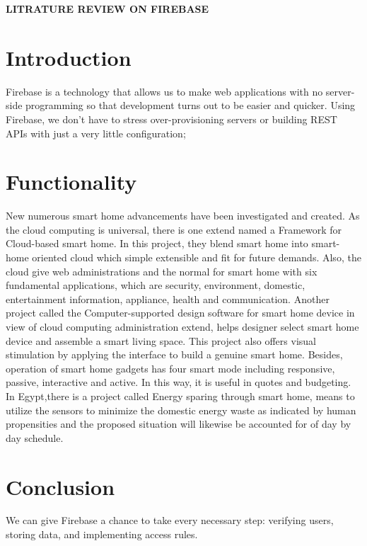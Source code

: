 \documentclass{article}
\begin{document}
	\textbf{LITRATURE REVIEW ON FIREBASE}
	\section{Introduction}
Firebase is a technology that allows us to make web applications with no server-side programming so that development turns out to be easier and quicker. Using Firebase, we don’t have to stress over-provisioning servers or building REST APIs with just a very little configuration; 
\newline
\section{Functionality}
New numerous smart home advancements have been investigated and created. As the cloud computing is universal, there is one extend named a Framework for Cloud-based smart home.\cite{r1} In this project, they blend smart home into smart-home oriented cloud which simple extensible and fit for future demands. Also, the cloud give web administrations and the normal for smart home with six fundamental applications, which are security, environment, domestic, entertainment information, appliance, health and communication. Another \cite{r2}project called the Computer-supported design software for smart home device in view of cloud computing administration extend, helps designer select smart home device and assemble a smart living space.\cite{r6} This project also offers visual stimulation by applying the interface to build a genuine smart home. Besides, operation of smart home gadgets has four smart mode including responsive, passive, interactive and active. In this way, it is useful in quotes and budgeting. In Egypt,\cite{r7}there is a project called Energy sparing through smart home, means to utilize the sensors to minimize the domestic energy waste as indicated by human propensities and the proposed situation will likewise be accounted for of day by day schedule.
\newline
\section{Conclusion}
We can give Firebase a chance to take every necessary step: verifying users, storing data, and implementing access rules.
	


\end{document}
